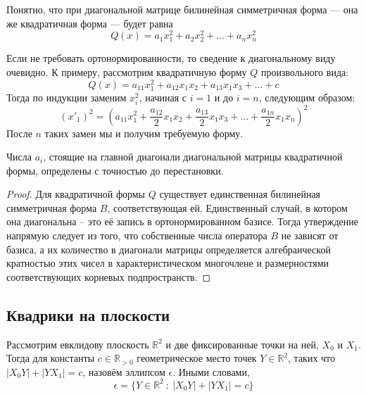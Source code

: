 \documentclass[11pt]{article}
\begin{document}
    \begin{remark}
    Понятно, что при диагональной матрице билинейная симметричная форма --- она же квадратичная форма --- будет равна
    \begin{equation*}
        Q(x) = a_1x_1^2 + a_2x_2^2 + \hdots + a_nx_n^2
    \end{equation*}
    \end{remark}

    \begin{remark}
    Если не требовать ортонормированности, то сведение к диагональному виду очевидно. К примеру, рассмотрим квадратичную форму $Q$ произвольного вида:
    \begin{equation*}
        Q(x) = a_{11}x_1^2 + a_{12}x_1x_2 + a_{13}x_1x_3 + \hdots + c
    \end{equation*}
    Тогда по индукции заменим $x_i^2$, начиная с $i = 1$ и до $i = n$, следующим образом:
    \begin{equation*}
        (x'_{1})^2 = (a_{11}x_1^2 + \dfrac{a_{12}}{2}x_1x_2 + \dfrac{a_{13}}{2}x_1x_3 + \hdots + \dfrac{a_{1n}}{2}x_1x_n)^2
    \end{equation*}
    После $n$ таких замен мы и получим требуемую форму.
    \end{remark}

    \begin{lemma}
    Числа $a_i$, стоящие на главной диагонали диагональной матрицы квадратичной формы, определены с точностью до перестановки.
    \end{lemma}

    \begin{proof}
    Для квадратичной формы $Q$ существует единственная билинейная симметричная форма $B$, соответствующая ей. Единственный случай, в котором она диагональна -- это её запись в ортонормированном базисе. Тогда утверждение напрямую следует из того, что собственные числа оператора $B$ не зависят от базиса, а их количество в диагонали матрицы определяется алгебраической кратностью этих чисел в характеристическом многочлене и размерностями соответствующих корневых подпространств.
    \end{proof}
    \subsection{Квадрики на плоскости}

    \begin{definition}
    Рассмотрим евклидову плоскость $\mathbb{R}^2$ и две фиксированные точки на ней, $X_0$ и $X_1$. Тогда для константы $c \in \mathbb{R}_{>0}$ геометрическое место точек $Y \in \mathbb{R}^2$, таких что $|X_0Y| + |YX_1| = c$, назовём эллипсом $\epsilon$. Иными словами,
    \begin{equation*}
        \epsilon = \{Y \in \mathbb{R}^2 \ :\ |X_0Y| + |YX_1| = c\}
    \end{equation*}
    \end{definition}
\end{document}
